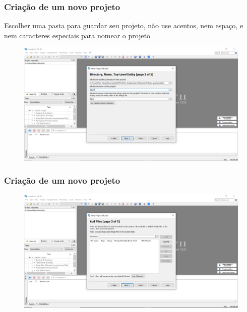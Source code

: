 \documentclass{CPSPresentation}
\begin{document}
\begin{frame}
	\frametitle{Criação de um novo projeto}
	
	\begin{block}{}
		\justifying
		Escolher uma pasta para guardar seu projeto, não use acentos, nem espaço, e nem caracteres especiais para nomear o projeto
	\end{block}
	
	\begin{figure}[h]
		\centering
		\includegraphics[width=1.02\textwidth]{quartus/fig09.png}
	\end{figure}
	
	
\end{frame}
\begin{frame}
	\frametitle{Criação de um novo projeto}
	
	
	\begin{figure}[h]
		\centering
		\includegraphics[width=1.02\textwidth]{quartus/fig10.png}
	\end{figure}
	
	
\end{frame}
\end{document}
